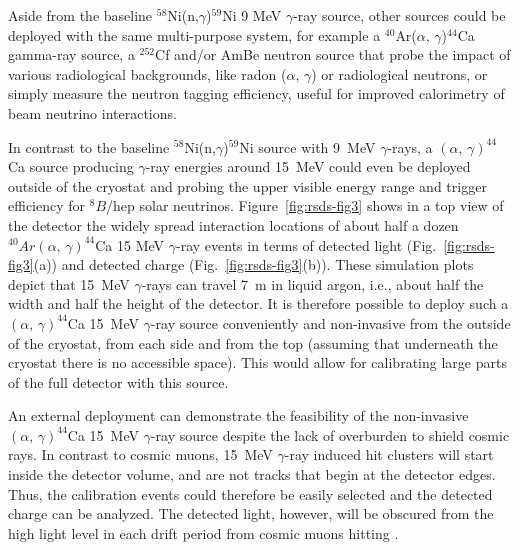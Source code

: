 Aside from the baseline $^{58}$Ni(n,$\gamma$)$^{59}$Ni 9 MeV $\gamma$-ray source, other sources could be deployed with the same multi-purpose system, for example a $^{40}$Ar($\alpha,\,\gamma$)$^{44}$Ca gamma-ray source, a $^{252}$Cf and/or AmBe neutron source that probe the impact of various radiological backgrounds, like radon ($\alpha,\,\gamma$) or radiological neutrons, or simply measure the neutron tagging efficiency, useful for improved calorimetry of beam neutrino interactions. 

In contrast to the baseline $^{58}$Ni(n,$\gamma$)$^{59}$Ni source with 9~MeV $\gamma$-rays, a $(\alpha,\,\gamma)^{44}$Ca source producing $\gamma$-ray energies around \SI{15}{MeV} could even be deployed outside of the cryostat and probing the upper visible energy range and trigger efficiency for $^{8}B$/hep solar neutrinos. Figure~\ref{fig:rsds-fig3}
shows in a top view of the detector the widely spread interaction locations of about half a dozen $^{40}Ar(\alpha,\,\gamma)^{44}$Ca 15 MeV $\gamma$-ray events in terms of detected light (Fig.~\ref{fig:rsds-fig3}(a)) and  detected charge (Fig.~\ref{fig:rsds-fig3}(b)). These simulation plots depict that 15~MeV $\gamma$-rays can travel \SI{7}{\m} in liquid argon, i.e., about half the width and half the height of the detector. It is therefore possible to deploy such a $(\alpha,\,\gamma)^{44}$Ca \SI{15}{MeV} $\gamma$-ray source conveniently and non-invasive from the outside of the cryostat, from each side and from the top (assuming that underneath the cryostat there is no accessible space). This would allow for calibrating large parts of the full detector with this source. 

An external  deployment can demonstrate the feasibility of the non-invasive $(\alpha,\,\gamma)^{44}$Ca \SI{15}{MeV} $\gamma$-ray source despite the lack of overburden to shield cosmic rays. In contrast to cosmic muons, \SI{15}{MeV} $\gamma$-ray induced hit clusters will start inside the detector volume, and are not tracks that begin at the detector edges. Thus, the  calibration events could therefore be easily selected and the detected charge can be analyzed. The detected light, however, will be obscured from the high light level in each drift period from cosmic muons hitting . 

